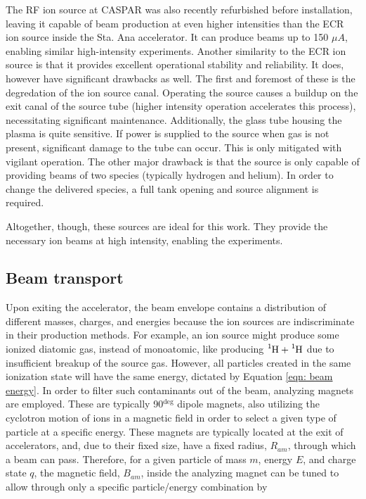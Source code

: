 The RF ion source at CASPAR was also recently refurbished before installation, leaving it capable of beam production at even higher intensities than the ECR ion source inside the Sta. Ana accelerator. It can produce beams up to 150 $\mu A$, enabling similar high-intensity experiments. Another similarity to the ECR ion source is that it provides excellent operational stability and reliability. It does, however have significant drawbacks as well. The first and foremost of these is the degredation of the ion source canal. Operating the source causes a buildup on the exit canal of the source tube (higher intensity operation accelerates this process), necessitating significant maintenance. Additionally, the glass tube housing the plasma is quite sensitive. If power is supplied to the source when gas is not present, significant damage to the tube can occur. This is only mitigated with vigilant operation. The other major drawback is that the source is only capable of providing beams of two species (typically hydrogen and helium). In order to change the delivered species, a full tank opening and source alignment is required. 

Altogether, though, these sources are ideal for this work. They provide the necessary ion beams at high intensity, enabling the experiments. 




\subsection{Beam transport}
\label{sec: beamline}


Upon exiting the accelerator, the beam envelope contains a distribution of different masses, charges, and energies because the ion sources are indiscriminate in their production methods. For example, an ion source might produce some ionized diatomic gas, instead of monoatomic, like producing $\ce{^{1}H}+\ce{^{1}H}$ due to insufficient breakup of the source gas. However, all particles created in the same ionization state will have the same energy, dictated by Equation \ref{eqn: beam energy}. In order to filter such contaminants out of the beam, analyzing magnets are employed. These are typically 90$^{\deg}$ dipole magnets, also utilizing the cyclotron motion of ions in a magnetic field in order to select a given type of particle at a specific energy. These magnets are typically located at the exit of accelerators, and, due to their fixed size, have a fixed radius, $R_{am}$, through which a beam can pass. Therefore, for a given particle of mass $m$, energy $E$, and charge state $q$, the magnetic field, $B_{am}$, inside the analyzing magnet can be tuned to allow through only a specific particle/energy combination by

